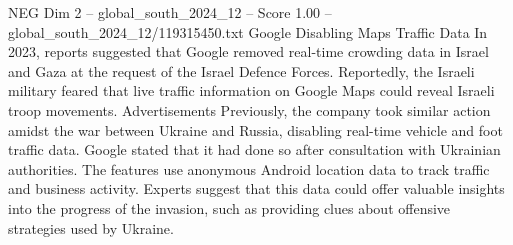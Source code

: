 \begin{textsample}{NEG Dim 2 – global\_south\_2024\_12 – Score 1.00 – global\_south\_2024\_12/119315450.txt}
Google Disabling Maps Traffic Data In 2023, reports suggested that Google removed real-time crowding data in Israel and Gaza at the request of the Israel Defence Forces.
Reportedly, the Israeli military feared that live traffic information on Google Maps could reveal Israeli troop movements.
Advertisements Previously, the company took similar action amidst the war between Ukraine and Russia, disabling real-time vehicle and foot traffic data.
Google stated that it had done so after consultation with Ukrainian authorities.
The features use anonymous Android location data to track traffic and business activity.
Experts suggest that this data could offer valuable insights into the progress of the invasion, such as providing clues about offensive strategies used by Ukraine.

\end{textsample}
